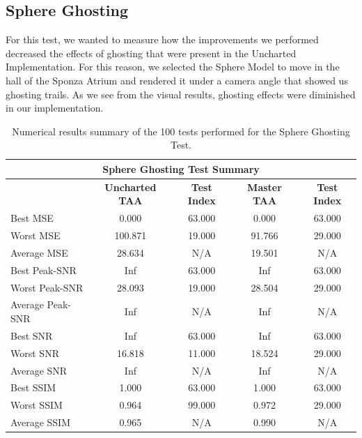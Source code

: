 \documentclass{cslthse-msc}
\begin{document}
\subsection{Sphere Ghosting}
For this test, we wanted to measure how the improvements we performed decreased the effects of ghosting that were present in the Uncharted Implementation. For this reason, we selected the Sphere Model to move in the hall of the Sponza Atrium and rendered it under a camera angle that showed us ghosting trails. As we see from the visual results, ghosting effects were diminished in our implementation. 
\begin{table}[H]
	\small
	\centering
	\caption{Numerical results summary of the 100 tests performed for the Sphere Ghosting Test.}
	\begin{tabular}{|l|c|c|c|c|}
		\hline
		\multicolumn{5}{|c|}{\textbf{Sphere Ghosting Test Summary}} \\
		\hline
		\multicolumn{1}{|c|}{\textbf{\diagbox{Tests}{AA}}} & \textbf{Uncharted TAA} & \textbf{Test Index} & \textbf{Master TAA} & \textbf{Test Index} \\
		\hline
		Best MSE & 0.000 & 63.000 & 0.000 & 63.000 \\
		\hline
		Worst MSE & 100.871 & 19.000 & 91.766 & 29.000 \\
		\hline
		Average MSE & 28.634 & N/A   & 19.501 & N/A \\
		\hline
		Best Peak-SNR & Inf   & 63.000 & Inf   & 63.000 \\
		\hline
		Worst Peak-SNR & 28.093 & 19.000 & 28.504 & 29.000 \\
		\hline
		Average Peak-SNR  & Inf   & N/A   & Inf   & N/A \\
		\hline
		Best SNR & Inf   & 63.000 & Inf   & 63.000 \\
		\hline
		Worst SNR & 16.818 & 11.000 & 18.524 & 29.000 \\
		\hline
		Average SNR  & Inf   & N/A   & Inf   & N/A \\
		\hline
		Best SSIM & 1.000 & 63.000 & 1.000 & 63.000 \\
		\hline
		Worst SSIM & 0.964 & 99.000 & 0.972 & 29.000 \\
		\hline
		Average SSIM & 0.965 & N/A   & 0.990 & N/A \\
		\hline
	\end{tabular}%
	\label{tab:sphere_ghosting}%
\end{table}%
\end{document}
